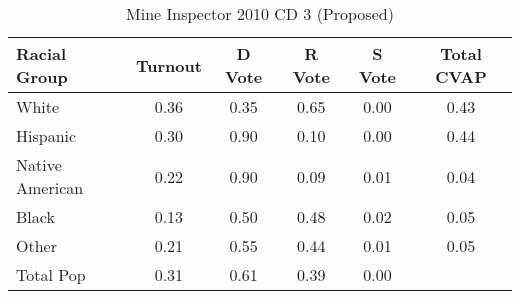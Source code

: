 \begin{table}[htb]
\begin{center}
\caption{Mine Inspector 2010 CD 3 (Proposed)}
\label{smine_cvap_cd_3}
\begin{tabular}{lccccc}
  \hline
Racial Group & Turnout & D Vote & R Vote & S Vote & Total CVAP \\ 
  \hline
White & 0.36 & 0.35 & 0.65 & 0.00 & 0.43 \\ 
  Hispanic & 0.30 & 0.90 & 0.10 & 0.00 & 0.44 \\ 
  Native American & 0.22 & 0.90 & 0.09 & 0.01 & 0.04 \\ 
  Black & 0.13 & 0.50 & 0.48 & 0.02 & 0.05 \\ 
  Other & 0.21 & 0.55 & 0.44 & 0.01 & 0.05 \\ 
  Total Pop & 0.31 & 0.61 & 0.39 & 0.00 &  \\ 
   \hline
\end{tabular}
\end{center}
\end{table}
